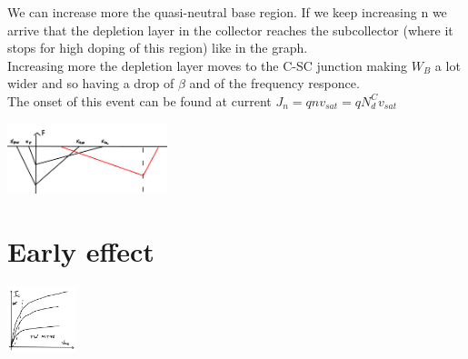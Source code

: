 We can increase more the quasi-neutral base region. If we keep increasing n we arrive that the depletion layer in the collector reaches the subcollector (where it stops for high doping of this region) like in the graph.\\
Increasing more the depletion layer moves to the C-SC junction making $W_B$ a lot wider and so having a drop of $\beta$ and of the frequency responce.\\
The onset of this event can be found at current $J_n=qnv_{sat}=qN_d^C v_{sat}$

\centering
\includegraphics[width=0.35\textwidth]{bjt11.png}\\
\raggedright

\section{Early effect}

\centering
\includegraphics[width=0.15\textwidth]{bjt12.png}\\
\raggedright

